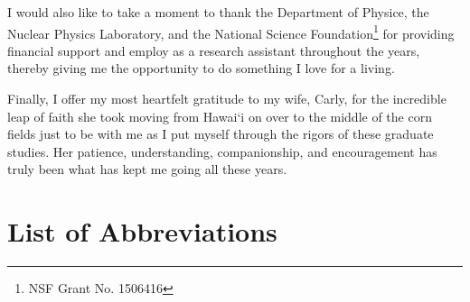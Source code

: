 \documentclass[edeposit,fullpage]{uiucthesis2009}
\begin{document}
I would also like to take a moment to thank the Department of Physice, the Nuclear Physics Laboratory, and the National Science Foundation\footnote{NSF Grant No. 1506416} for providing financial support and employ as a research assistant throughout the years, thereby giving me the opportunity to do something I love for a living.

Finally, I offer my most heartfelt gratitude to my wife, Carly, for the incredible leap of faith she took moving from Hawai`i on over to the middle of the corn fields just to be with me as I put myself through the rigors of these graduate studies. Her patience, understanding, companionship, and encouragement has truly been what has kept me going all these years.


\tableofcontents
\listoftables
\listoffigures

\chapter{List of Abbreviations}
\end{document}
